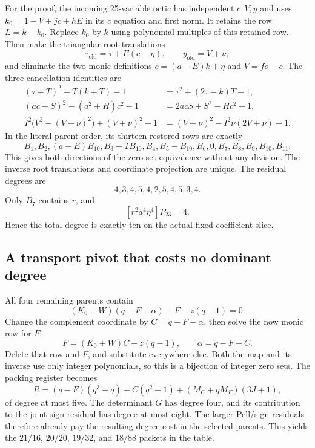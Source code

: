 For the proof, the incoming 25-variable octic has independent $c,V,y$ and
uses $k_0=1-V+jc+hE$ in its $c$ equation and first norm. It retains the
row $L=k-k_0$. Replace $k_0$ by $k$ using polynomial multiples of this
retained row. Then make the triangular root translations
\[
 \tau_{\mathrm{old}}=\tau+E(c-\eta),\qquad
 y_{\mathrm{old}}=V+\nu,
\]
and eliminate the two monic definitions $c=(a-E)k+\eta$ and $V=fo-c$.
The three cancellation identities are
\begin{align*}
 (\tau+T)^2-T(k+T)-1
   &=\tau^2+(2\tau-k)T-1,\\
 (ac+S)^2-(a^2+H)c^2-1
   &=2acS+S^2-Hc^2-1,\\
 I^2\bigl(V^2-(V+\nu)^2\bigr)+(V+\nu)^2-1
   &=(V+\nu)^2-I^2\nu(2V+\nu)-1.
\end{align*}
In the literal parent order, its thirteen restored rows are exactly
\[
 B_1,B_2,(a-E)B_{10},B_3+TB_{10},B_4,B_5-B_{10},
 B_6,0,B_7,B_8,B_9,B_{10},B_{11}.
\]
This gives both directions of the zero-set equivalence without any
division. The inverse root translations and coordinate projection are
unique. The residual degrees are
\[
 4,3,4,5,4,2,5,4,5,3,4.
\]
Only $B_7$ contains $r$, and
\[
 [r^2a^4\eta^4]P_{23}=4.
\]
Hence the total degree is exactly ten on the actual fixed-coefficient slice.

\subsection{A transport pivot that costs no dominant degree}
All four remaining parents contain
\[
 (K_0+W)(q-F-\alpha)-F-z(q-1)=0.
\]
Change the complement coordinate by $C=q-F-\alpha$, then solve the
now monic row for $F$:
\[
 F=(K_0+W)C-z(q-1),\qquad \alpha=q-F-C.
\]
Delete that row and $F$, and substitute everywhere else. Both the map and
its inverse use only integer polynomials, so this is a bijection of integer
zero sets. The packing register becomes
\[
 R=(q-F)(q^3-q)-C(q^2-1)+(M_C+qM_F)(3J+1),
\]
of degree at most five. The determinant $G$ has degree four, and its
contribution to the joint-sign residual has degree at most eight.
The larger Pell/sign residuals therefore already pay the resulting degree
cost in the selected parents. This yields the $21/16$, $20/20$, $19/32$,
and $18/88$ packets in the table.

